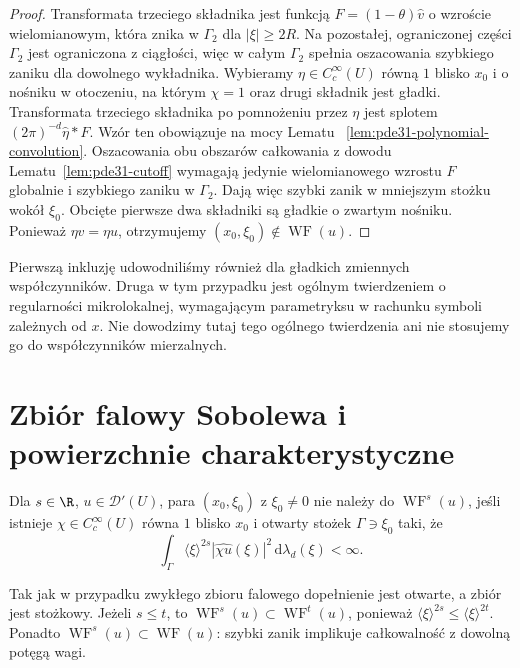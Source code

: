 \begin{proof}
Transformata trzeciego składnika jest funkcją
$F=(1-\theta)\widehat v$ o wzroście wielomianowym,
która znika w $\Gamma_2$ dla $|\xi|\ge2R$.
Na pozostałej, ograniczonej części $\Gamma_2$
jest ograniczona z ciągłości, więc w całym
$\Gamma_2$ spełnia oszacowania szybkiego zaniku
dla dowolnego wykładnika.
Wybieramy $\eta\in C_c^\infty(U)$ równą $1$
blisko $x_0$ i o nośniku w otoczeniu,
na którym $\chi=1$ oraz drugi składnik jest gładki.
Transformata trzeciego składnika po pomnożeniu
przez $\eta$ jest splotem $(2\pi)^{-d}\widehat\eta*F$.
Wzór ten obowiązuje na mocy Lematu
~\ref{lem:pde31-polynomial-convolution}.
Oszacowania obu obszarów całkowania z dowodu
Lematu~\ref{lem:pde31-cutoff} wymagają jedynie
wielomianowego wzrostu $F$ globalnie i szybkiego
zaniku w $\Gamma_2$. Dają więc szybki zanik
w mniejszym stożku wokół $\xi_0$.
Obcięte pierwsze dwa składniki są gładkie
o zwartym nośniku. Ponieważ $\eta v=\eta u$,
otrzymujemy $(x_0,\xi_0)\notin\operatorname{WF}(u)$.
\end{proof}

\begin{uwaga}
Pierwszą inkluzję udowodniliśmy również dla
gładkich zmiennych współczynników.
Druga w tym przypadku jest ogólnym twierdzeniem
o regularności mikrolokalnej, wymagającym
parametryksu w rachunku symboli zależnych od $x$.
Nie dowodzimy tutaj tego ogólnego twierdzenia
ani nie stosujemy go do współczynników mierzalnych.
\end{uwaga}

\section{Zbiór falowy Sobolewa i powierzchnie charakterystyczne}
\begin{definicja}
\label{def:pde31-wfs}
Dla $s\in\R$, $u\in\mathcal D'(U)$, para $(x_0,\xi_0)$
z $\xi_0\ne0$ nie należy do $\operatorname{WF}^s(u)$,
jeśli istnieje $\chi\in C_c^\infty(U)$ równa
$1$ blisko $x_0$ i otwarty stożek $\Gamma\ni\xi_0$
taki, że
\[
 \int_\Gamma\langle\xi\rangle^{2s}
 |\widehat{\chi u}(\xi)|^2\,\mathrm d\lambda_d(\xi)<\infty.
\]
\end{definicja}
Tak jak w przypadku zwykłego zbioru falowego
dopełnienie jest otwarte, a zbiór jest stożkowy.
Jeżeli $s\le t$, to $\operatorname{WF}^s(u)\subset
\operatorname{WF}^t(u)$, ponieważ
$\langle\xi\rangle^{2s}\le\langle\xi\rangle^{2t}$.
Ponadto $\operatorname{WF}^s(u)\subset\operatorname{WF}(u)$:
szybki zanik implikuje całkowalność z dowolną
potęgą wagi.

